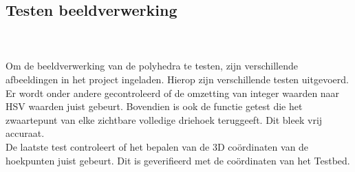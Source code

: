 \subsection{Testen beeldverwerking}
\\\\
Om de beeldverwerking van de polyhedra te testen, zijn verschillende afbeeldingen in het project ingeladen. Hierop zijn verschillende testen uitgevoerd. Er wordt onder andere gecontroleerd of de omzetting van integer waarden naar HSV waarden juist gebeurt. Bovendien is ook de functie getest die het zwaartepunt van elke zichtbare volledige driehoek teruggeeft. Dit bleek vrij accuraat.
\\
De laatste test controleert of het bepalen van de 3D co\"ordinaten van de hoekpunten juist gebeurt. Dit is geverifieerd met de co\"ordinaten van het Testbed.
